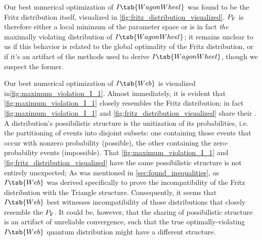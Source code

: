 \documentclass[aps, 10pt, english, twoside, pra, nofootinbib, tightenlines, longbibliography, superscriptaddress]{revtex4-1}
\begin{document}

    Our best numerical optimization of $I\tsb{WagonWheel}$ was found to be the Fritz distribution itself, visualized in \cref{fig:fritz_distribution_visualized}. $\prob[\fritz]$ is therefore either a local minimum of the parameter space or is in fact \textit{the} maximally violating distribution of $I\tsb{WagonWheel}$; it remains unclear to us if this behavior is related to the global optimality of the Fritz distribution, or if it's an artifact of the methods used to derive $I\tsb{WagonWheel}$, though we suspect the former.

    Our best numerical optimization of $I\tsb{Web}$ is visualized in\cref{fig:maximum_violation_I_1}. Almost immediately, it is evident that \cref{fig:maximum_violation_I_1} closely resembles the Fritz distribution; in fact \cref{fig:maximum_violation_I_1} and \cref{fig:fritz_distribution_visualized} share their . A distribution's possibilistic structure is the unitization of its probabilities, i.e. the partitioning of events into disjoint subsets: one containing those events that occur with nonzero probability (possible), the other containing the zero-probability events (impossible).
    That \cref{fig:maximum_violation_I_1} and \cref{fig:fritz_distribution_visualized} have the same possibilistic structure is not entirely unexpected;  As was mentioned in \cref{sec:found_inequalities}, as $I\tsb{Web}$ was derived specifically to prove the incompatibility of the Fritz distribution with the Triangle structure. Consequently, it seems that $I\tsb{Web}$ best witnesses incompatibility of those distributions that closely resemble the $\prob[\fritz]$. It could be, however, that the sharing of possibilistic structure is an artifact of unreliable convergence, such that the true optimally-violating $I\tsb{Web}$ quantum distribution might have a different structure.
\end{document}

